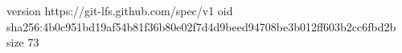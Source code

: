 version https://git-lfs.github.com/spec/v1
oid sha256:4b0c951bd19af54b81f36b80e02f7d4d9beed94708be3b012ff603b2cc6fbd2b
size 73
